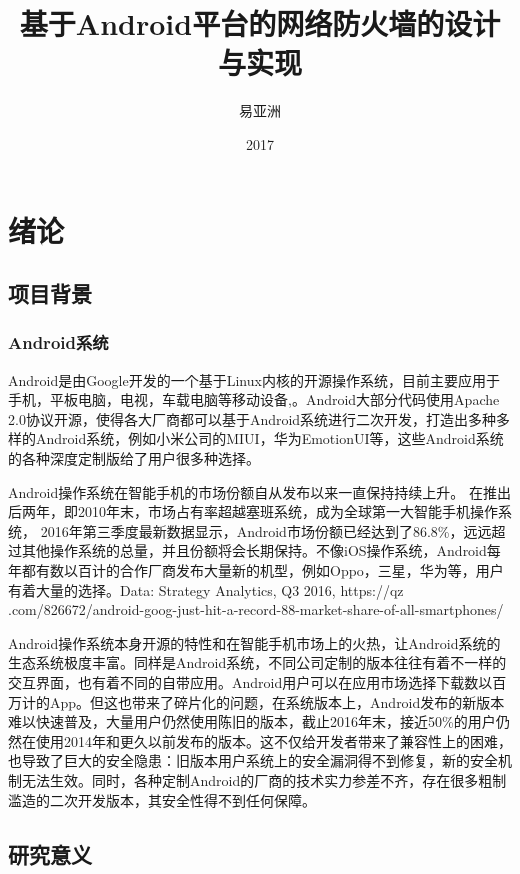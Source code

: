 \documentclass[format=final, language=chinese, degree=fyp]{hustthesis}
\title{基于Android平台的网络防火墙的设计与实现}{An Implementation of Android Firewall}
\author{易亚洲}{Yazhou Yi}
\date{2017}{6}{10}
\begin{document}
\frontmatter
\maketitle
\makeabstract
\tableofcontents
\listoffigures
\listoftables
\mainmatter

\chapter{绪论}\label{chapter:1}
\section{项目背景}

\subsection{Android系统}
Android是由Google开发的一个基于Linux内核的开源操作系统，目前主要应用于手机，平板电脑，电视，车载电脑等移动设备,。Android大部分代码使用Apache 2.0协议开源，使得各大厂商都可以基于Android系统进行二次开发，打造出多种多样的Android系统，例如小米公司的MIUI，华为EmotionUI等，这些Android系统的各种深度定制版给了用户很多种选择。

Android操作系统在智能手机的市场份额自从发布以来一直保持持续上升。
在推出后两年，即2010年末，市场占有率超越塞班系统，成为全球第一大智能手机操作系统，
2016年第三季度最新数据显示，Android市场份额已经达到了86.8\%，远远超过其他操作系统的总量，并且份额将会长期保持。不像iOS操作系统，Android每年都有数以百计的合作厂商发布大量新的机型，例如Oppo，三星，华为等，用户有着大量的选择。Data: Strategy Analytics, Q3 2016, https://qz
.com/826672/android-goog-just-hit-a-record-88-market-share-of-all-smartphones/

Android操作系统本身开源的特性和在智能手机市场上的火热，让Android系统的生态系统极度丰富。同样是Android系统，不同公司定制的版本往往有着不一样的交互界面，也有着不同的自带应用。Android用户可以在应用市场选择下载数以百万计的App。但这也带来了碎片化的问题，在系统版本上，Android发布的新版本难以快速普及，大量用户仍然使用陈旧的版本，截止2016年末，接近50\%的用户仍然在使用2014年和更久以前发布的版本。这不仅给开发者带来了兼容性上的困难，也导致了巨大的安全隐患：旧版本用户系统上的安全漏洞得不到修复，新的安全机制无法生效。同时，各种定制Android的厂商的技术实力参差不齐，存在很多粗制滥造的二次开发版本，其安全性得不到任何保障。


\section{研究意义}
\end{document}

